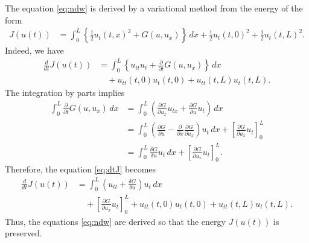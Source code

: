 \documentclass[dvipdfmx-if-dvi,autodetect-engine,ja=standard]{amsart}
\numberwithin{equation}{section} %
\begin{document}
The equation \eqref{eq:ndw} is derived by
a variational method from the
energy of the form
\begin{align}
    J(u(t))
    &= \int_0^L
    \left\{ \frac{1}{2} u_t(t,x)^2 + G(u,u_x) \right\} \,dx
    + \frac{1}{2} u_t(t,0)^2 + \frac{1}{2} u_t(t,L)^2.
\end{align}
Indeed, we have
\begin{align}\label{eq:dtJ}
    \frac{d}{dt} J(u(t))
    &= \int_0^L \left\{ u_{tt} u_t + \frac{\partial}{\partial t} G(u,u_x) \right\} \,dx \\
    &\quad 
    + u_{tt}(t,0) u_t(t,0) + u_{tt}(t,L) u_t(t,L).
\end{align}
The integration by parts implies
\begin{align}
    \int_0^L \frac{\partial}{\partial t} G(u,u_x) \,dx
    &=
    \int_0^L \left(
        \frac{\partial G}{\partial u_x} u_{tx} + \frac{\partial G}{\partial u} u_t
    \right)\,dx \\
    &= \int_0^L \left(
            \frac{\partial G}{\partial u} - \frac{\partial}{\partial x} \frac{\partial G}{\partial u_x} 
            \right) u_t \,dx
        + \left[
            \frac{\partial G}{\partial u_x} u_t
        \right]_0^L \\
    &= \int_0^L \frac{\delta G}{\delta u} u_t \,dx
        + \left[
            \frac{\partial G}{\partial u_x} u_t
        \right]_0^L .
\end{align}
Therefore, the equation \eqref{eq:dtJ} becomes
\begin{align}
    \frac{d}{dt} J(u(t))
    &= \int_0^L \left( u_{tt} + \frac{\delta G}{\delta u} \right) u_t \,dx \\
    &\quad
    + \left[
            \frac{\partial G}{\partial u_x} u_t
        \right]_0^L
    + u_{tt}(t,0) u_t(t,0) + u_{tt}(t,L) u_t(t,L).
\end{align}
Thus, the equations \eqref{eq:ndw} are
derived so that the energy
$J(u(t))$
is preserved.
\end{document}

